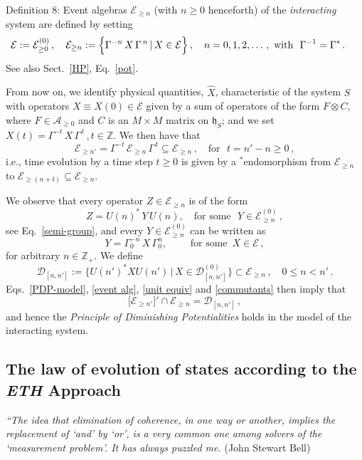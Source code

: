 \documentclass[12pt]{article}
\begin{document}
{Definition 8}:  Event algebras $\mathcal{E}_{\geq n}$ (with $n\geq 0$ henceforth) of the \textit{interacting} system are defined by setting
\begin{equation}\label{event alg}
\mathcal{E}:= \mathcal{E}_{\geq 0}^{(0)}\,, \quad \mathcal{E}_{\geq n} := \Big\{\Gamma^{-n}\, X\, \Gamma^{\,n}\, \vert\, X \in \mathcal{E} \Big\}\,,\quad n=0,1,2,\dots\,, \text{\,\,with\,\,\,\,}\Gamma^{-1}= \Gamma^{*}\,. \quad\,\, \square
\end{equation}
See also Sect.~\ref{HP}, Eq.~\eqref{pot}.

From now on, we identify physical quantities, $\hat{X}$, characteristic of the system $S$ with operators $X\equiv X(0) \in
\mathcal{E}$ given by a sum of operators of the form $F\otimes C$, where $F\in \mathcal{A}_{\geq 0}$ and $C$ is
an $M\times M$ matrix on $\mathfrak{h}_S$; and we set $X(t)= \Gamma^{-t}\,X\,\Gamma^{\,t}\,, t\in \mathbb{Z}.$ We then have that
$$\mathcal{E}_{\geq n'} = \Gamma^{-t}\, \mathcal{E}_{\geq n} \, \Gamma^{\,t} \subseteq \mathcal{E}_{\geq n}\,, \quad \text{for  }\,\, t= n'-n\geq 0\,,$$
i.e., time evolution by a time step $t\geq 0$ is given by a $^{*}$endomorphism from $\mathcal{E}_{\geq n}$ to
$\mathcal{E}_{\geq (n+t)}\subseteq \mathcal{E}_{\geq n}$.

We observe that every operator $Z\in \mathcal{E}_{\geq n}$ is of the form
\begin{equation}\label{unit equiv}
Z= U(n)^{*}\, Y \,U(n),\quad \text{for some }\,\, Y\in \mathcal{E}_{\geq n}^{(0)}\,,
\end{equation}
see Eq.~\eqref{semi-group}, and every $Y\in \mathcal{E}_{\geq n}^{(0)}$ can be written as
\begin{equation}\label{conjugation}
Y= \Gamma_{0}^{-n}\,X\,\Gamma_{0}^{n}, \qquad \text{  for some  }\, X\in \mathcal{E}\,,
\end{equation}
for arbitrary $n\in \mathbb{Z}_{+}$. We define
\begin{equation}\label{commutants}
\mathcal{D}_{[n,n']}:= \big\{U(n')^{*} X U(n')\,\vert\, X \in \mathcal{D}_{[n,n']}^{(0)}\big\} \subset \mathcal{E}_{\geq n}\,,
\quad 0\leq n<n'\,.
\end{equation}
Eqs.~\eqref{PDP-model}, \eqref{event alg}, \eqref{unit equiv} and \eqref{commutants} then imply that
$$\big[\mathcal{E}_{\geq n'}\big]' \cap \mathcal{E}_{\geq n} = \mathcal{D}_{[n,n']}\,,$$
and hence the \textit{Principle of Diminishing Potentialities} holds in the model of the interacting system.

\subsection{The law of evolution of states according to the \textit{ETH} Approach}
\hspace{0.5cm}\textit{``The idea that elimination of coherence, in one way or another, implies the replacement of `and' by `or', is a very common one among solvers of the `measurement problem'. It has always puzzled me.} (John Stewart Bell)\\
\end{document}
